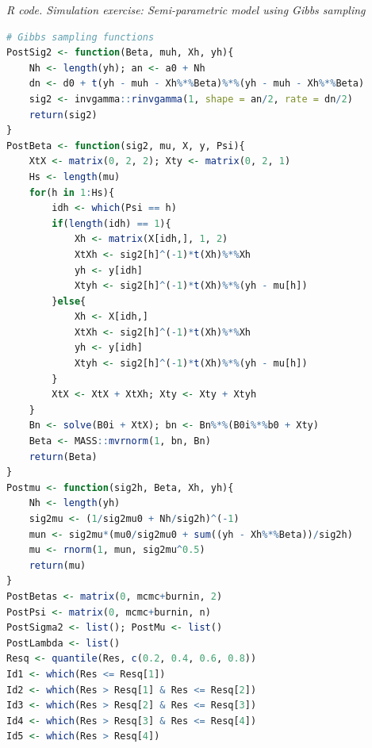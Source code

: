 \begin{tcolorbox}[enhanced,width=4.67in,center upper,
	fontupper=\large\bfseries,drop shadow southwest,sharp corners]
	\textit{R code. Simulation exercise: Semi-parametric model using Gibbs sampling}
	\begin{VF}
		\begin{lstlisting}[language=R]
# Gibbs sampling functions
PostSig2 <- function(Beta, muh, Xh, yh){
	Nh <- length(yh); an <- a0 + Nh
	dn <- d0 + t(yh - muh - Xh%*%Beta)%*%(yh - muh - Xh%*%Beta)
	sig2 <- invgamma::rinvgamma(1, shape = an/2, rate = dn/2)
	return(sig2)
}
PostBeta <- function(sig2, mu, X, y, Psi){
	XtX <- matrix(0, 2, 2); Xty <- matrix(0, 2, 1)
	Hs <- length(mu)
	for(h in 1:Hs){
		idh <- which(Psi == h)
		if(length(idh) == 1){
			Xh <- matrix(X[idh,], 1, 2)
			XtXh <- sig2[h]^(-1)*t(Xh)%*%Xh
			yh <- y[idh]
			Xtyh <- sig2[h]^(-1)*t(Xh)%*%(yh - mu[h])
		}else{
			Xh <- X[idh,]
			XtXh <- sig2[h]^(-1)*t(Xh)%*%Xh
			yh <- y[idh]
			Xtyh <- sig2[h]^(-1)*t(Xh)%*%(yh - mu[h])
		}
		XtX <- XtX + XtXh; Xty <- Xty + Xtyh
	}
	Bn <- solve(B0i + XtX); bn <- Bn%*%(B0i%*%b0 + Xty)
	Beta <- MASS::mvrnorm(1, bn, Bn)
	return(Beta)
}
Postmu <- function(sig2h, Beta, Xh, yh){
	Nh <- length(yh)
	sig2mu <- (1/sig2mu0 + Nh/sig2h)^(-1)
	mun <- sig2mu*(mu0/sig2mu0 + sum((yh - Xh%*%Beta))/sig2h)
	mu <- rnorm(1, mun, sig2mu^0.5)
	return(mu)
}
PostBetas <- matrix(0, mcmc+burnin, 2)
PostPsi <- matrix(0, mcmc+burnin, n)
PostSigma2 <- list(); PostMu <- list()
PostLambda <- list()
Resq <- quantile(Res, c(0.2, 0.4, 0.6, 0.8))
Id1 <- which(Res <= Resq[1])
Id2 <- which(Res > Resq[1] & Res <= Resq[2])
Id3 <- which(Res > Resq[2] & Res <= Resq[3])
Id4 <- which(Res > Resq[3] & Res <= Resq[4])
Id5 <- which(Res > Resq[4])
\end{lstlisting}
	\end{VF}
\end{tcolorbox}

